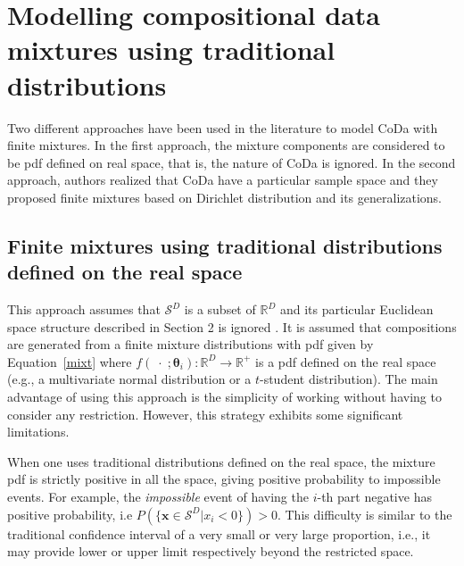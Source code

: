 \documentclass[12pt, a4paper]{article}
\newcommand{\m}[1]{\boldsymbol{#1}}
\begin{document}

\section{Modelling compositional data mixtures using traditional distributions}
\label{standard_section}

\noindent Two different approaches have been used in the literature to model CoDa with finite mixtures. 
In the first approach,  the mixture components are considered to be pdf defined on real space, that is, the nature of CoDa is ignored. In the second approach, authors realized that CoDa have a particular sample space and they proposed finite mixtures based on Dirichlet distribution and its generalizations.


\subsection{Finite mixtures using traditional distributions defined on the real space}
\label{real_section}

This approach assumes that $\mathcal{S}^D$ is a subset of $\mathbb{R}^D$ and its particular Euclidean space structure described in Section 2 is ignored \citep[][]{papageorgiou2001model}. It is assumed that compositions  are generated from a finite mixture distributions with pdf given by Equation~\ref{mixt} where $f(\;\cdot\;;\m\theta_i): \mathbb{R}^D \rightarrow \mathbb{R}^+$ is a pdf defined on the real space (e.g., a multivariate normal distribution or a  $t$-student distribution). The main advantage of using this approach is the simplicity of working without having to consider any restriction. However, this strategy exhibits some significant limitations.

When one uses traditional distributions defined on the real space, the mixture pdf is strictly positive in all the space, giving positive probability to impossible events. For example, the \emph{impossible} event  of having the $i$-th part negative has positive probability, i.e $P(\{ \textbf{x} \in \mathcal{S}^D | x_i < 0 \}) > 0$. This difficulty is similar to the traditional confidence interval of a very small or very large proportion, i.e., it may provide lower or upper limit respectively beyond the restricted space. 
\end{document}
